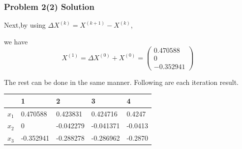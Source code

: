 \documentclass{beamer}
\begin{document}
\begin{frame}
\frametitle{Problem 2(2) Solution}
Next,by using $\Delta X^{(k)}=X^{(k+1)}-X^{(k)}$,

we have 
\begin{equation}
X^{(1)}=\Delta X^{(0)}+X^{(0)}=\left(\begin{array}{c}
0.470588 \\
0 \\
-0.352941
\end{array}\right)
\end{equation}

The rest can be done in the same manner. Following are each iteration result.

\begin{table}[]
\begin{tabular}{lllll}
\hline
      & 1         & 2         & 3         & 4       \\ \hline
$x_1$ & 0.470588  & 0.423831  & 0.424716  & 0.4247  \\
$x_2$ & 0         & -0.042279 & -0.041371 & -0.0413 \\
$x_3$ & -0.352941 & -0.288278 & -0.286962 & -0.2870 \\ \hline
\end{tabular}
\end{table}

\end{frame}
\end{document}
